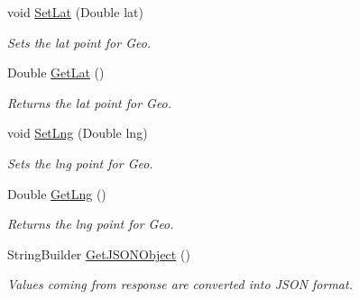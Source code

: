 \begin{DoxyCompactItemize}
\item 
void \hyperlink{classcom_1_1shephertz_1_1app42_1_1paas_1_1sdk_1_1csharp_1_1storage_1_1_geo_tag_a4bbf6a20958152d8db82bdb25a7d314c}{Set\+Lat} (Double lat)
\begin{DoxyCompactList}\small\item\em Sets the lat point for Geo. \end{DoxyCompactList}\item 
Double \hyperlink{classcom_1_1shephertz_1_1app42_1_1paas_1_1sdk_1_1csharp_1_1storage_1_1_geo_tag_a9be8fba236e1a296b0d0eef940884246}{Get\+Lat} ()
\begin{DoxyCompactList}\small\item\em Returns the lat point for Geo. \end{DoxyCompactList}\item 
void \hyperlink{classcom_1_1shephertz_1_1app42_1_1paas_1_1sdk_1_1csharp_1_1storage_1_1_geo_tag_abb82b79dd853d5783266575178573294}{Set\+Lng} (Double lng)
\begin{DoxyCompactList}\small\item\em Sets the lng point for Geo. \end{DoxyCompactList}\item 
Double \hyperlink{classcom_1_1shephertz_1_1app42_1_1paas_1_1sdk_1_1csharp_1_1storage_1_1_geo_tag_a2dd00358b93e8cdfb5d6a0974eb8e898}{Get\+Lng} ()
\begin{DoxyCompactList}\small\item\em Returns the lng point for Geo. \end{DoxyCompactList}\item 
String\+Builder \hyperlink{classcom_1_1shephertz_1_1app42_1_1paas_1_1sdk_1_1csharp_1_1storage_1_1_geo_tag_ab8ecea7c0066f74e686b8202077fabcb}{Get\+J\+S\+O\+N\+Object} ()
\begin{DoxyCompactList}\small\item\em Values coming from response are converted into J\+S\+O\+N format. \end{DoxyCompactList}\end{DoxyCompactItemize}


